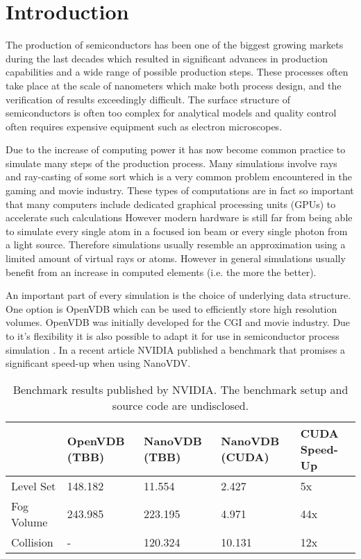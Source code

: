 \section{Introduction}
The production of semiconductors has been one of the biggest growing markets during the last decades which resulted in significant advances in production capabilities and a wide range of possible production steps.
These processes often take place at the scale of nanometers which make both process design, and the verification of results exceedingly difficult.
The surface structure of semiconductors is often too complex for analytical models and quality control often requires expensive equipment such as electron microscopes.

Due to the increase of computing power it has now become common practice to simulate many steps of the production process.
Many simulations involve rays and ray-casting of some sort which is a very common problem encountered in the gaming and movie industry.
These types of computations are in fact so important that many computers include dedicated graphical processing units (GPUs) to accelerate such calculations
However modern hardware is still far from being able to simulate every single atom in a focused ion beam or every single photon from a light source.
Therefore simulations usually resemble an approximation using a limited amount of virtual rays or atoms.
However in general simulations usually benefit from an increase in computed elements (i.e. the more the better).



An important part of every simulation is the choice of underlying data structure.
One option is OpenVDB which can be used to efficiently store high resolution volumes. \cite{openvdb}
OpenVDB was initially developed for the CGI and movie industry. Due to it's flexibility it is also possible to adapt it for use in semiconductor process simulation \cite{manstetten2018efficient}.
In a recent article  NVIDIA published a benchmark that promises a significant speed-up when using NanoVDV.

\begin{table}[H]
	\caption{Benchmark results published by NVIDIA. The benchmark setup and source code are undisclosed. \cite{nanovdb_nvidia}}
	\centering
	\begin{tabular}{@{}lllll@{}}
		\toprule
		           & OpenVDB (TBB) & NanoVDB (TBB) & NanoVDB (CUDA) & CUDA Speed-Up \\	\hline
		Level Set  & 148.182       & 11.554        & 2.427          & 5x            \\
		Fog Volume & 243.985       & 223.195       & 4.971          & 44x           \\
		Collision  & -             & 120.324       & 10.131         & 12x           \\ \bottomrule
	\end{tabular}
	\label{tab:nvidia_benchmark}
\end{table}

